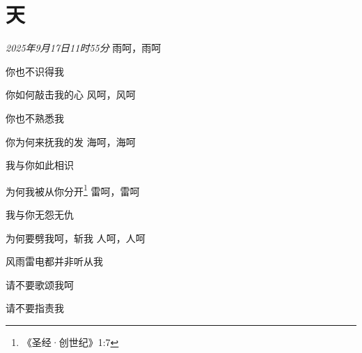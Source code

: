 \section*{天}
\begin{center}
\textit{2025年9月17日11时55分}\hh 
雨呵，雨呵

你也不识得我

你如何敲击我的心\hh
风呵，风呵

你也不熟悉我

你为何来抚我的发\hh
海呵，海呵

我与你如此相识

为何我被从你分开\footnote{《圣经·创世纪》1:7}\hh
雷呵，雷呵

我与你无怨无仇

为何要劈我呵，斩我\hh
人呵，人呵

风雨雷电都并非听从我

请不要歌颂我呵

请不要指责我
\end{center}